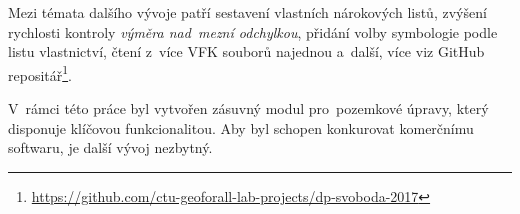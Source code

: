 Mezi témata dalšího vývoje patří sestavení vlastních nárokových listů, zvýšení rychlosti kontroly \textit{výměra nad~mezní odchylkou}, přidání volby symbologie podle listu vlastnictví, čtení z~více VFK souborů najednou a~další, více viz GitHub repositář\footnote{\url{https://github.com/ctu-geoforall-lab-projects/dp-svoboda-2017}}.

V~rámci této práce byl vytvořen zásuvný modul pro~pozemkové úpravy, který disponuje klíčovou funkcionalitou. Aby byl schopen konkurovat komerčnímu softwaru, je další vývoj nezbytný.
